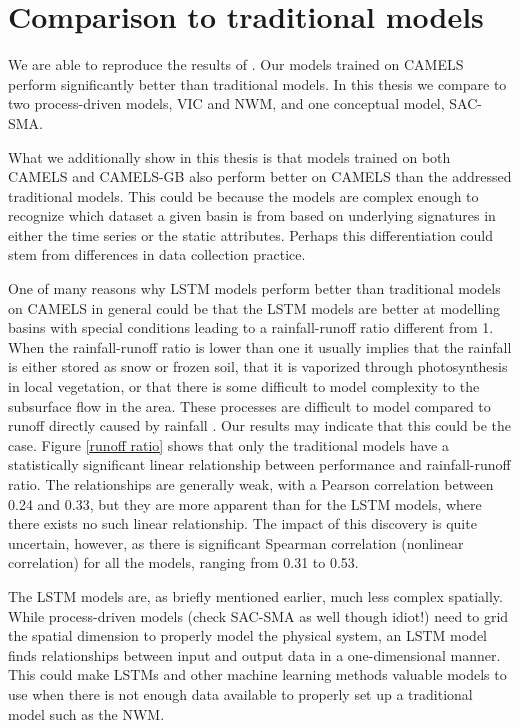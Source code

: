 \section{Comparison to traditional models}
We are able to reproduce the results of \citet{lstm_second_paper,lstm_third_paper}. 
Our models 
trained on CAMELS perform significantly better than traditional models. In this 
thesis we compare to two process-driven models, VIC and NWM, and one conceptual 
model, SAC-SMA. 

What we additionally show in this thesis is that models trained on both CAMELS and CAMELS-GB 
also perform better on CAMELS than the addressed traditional models. This could 
be because the models are complex enough to recognize which dataset a given 
basin is from based on underlying signatures in either the time series or the 
static attributes. Perhaps this differentiation could stem from differences in 
data collection practice. 

One of many reasons why LSTM models perform better than traditional models on CAMELS in general 
could be that the LSTM 
models are better at modelling basins with special conditions leading to 
a rainfall-runoff ratio different from 1. When the rainfall-runoff ratio is lower 
than one it usually implies that the rainfall is either stored as snow or frozen 
soil, that it is vaporized through photosynthesis in local vegetation, or that there 
is some difficult to model complexity to the subsurface flow in the area. 
These processes are difficult to model compared to runoff directly caused by 
rainfall \citep{process-driven-history}.
Our results may indicate that this could be the case.
Figure \ref{runoff ratio} shows that only the traditional models have 
a statistically significant linear relationship between performance and 
rainfall-runoff ratio. The relationships are generally weak, with a Pearson 
correlation between 0.24 and 0.33, but they are more apparent than 
for the LSTM models, where there exists no such linear relationship. The impact 
of this discovery is quite uncertain, however, as there is significant 
Spearman correlation (nonlinear correlation) for all the models, ranging 
from 0.31 to 0.53.

The LSTM models are, as briefly mentioned earlier, much less complex spatially. 
While process-driven models (check SAC-SMA as well though idiot!) need to grid the 
spatial dimension to properly model the physical system, an LSTM model finds 
relationships between input and output data in a one-dimensional manner. This could 
make LSTMs and other machine learning methods valuable models to use when there is not 
enough data available to properly set up a traditional model such as the NWM.
